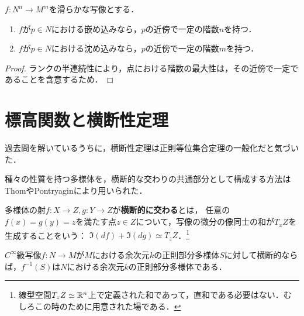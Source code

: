 \documentclass[uplatex,dvipdfmx]{jsreport}
\begin{document}
\begin{theorem}
    $f:N^n\to M^m$を滑らかな写像とする．
    \begin{enumerate}
        \item $f$が$p\in N$における嵌め込みなら，$p$の近傍で一定の階数$n$を持つ．
        \item $f$が$p\in N$における沈め込みなら，$p$の近傍で一定の階数$m$を持つ．
    \end{enumerate}
\end{theorem}
\begin{proof}
    ランクの半連続性により，点における階数の最大性は，その近傍で一定であることを含意するため．
\end{proof}

\section{標高関数と横断性定理}

\begin{tcolorbox}[colframe=ForestGreen, colback=ForestGreen!10!white,breakable,colbacktitle=ForestGreen!40!white,coltitle=black,fonttitle=\bfseries\sffamily,
title=]
    過去問を解いているうちに，横断性定理は正則等位集合定理の一般化だと気づいた．
\end{tcolorbox}

\begin{tcolorbox}[colframe=ForestGreen, colback=ForestGreen!10!white,breakable,colbacktitle=ForestGreen!40!white,coltitle=black,fonttitle=\bfseries\sffamily,
    title=]
    種々の性質を持つ多様体を，横断的な交わりの共通部分として構成する方法はThomやPontryaginにより用いられた．
\end{tcolorbox}

\begin{definition}[transversality]
    多様体の射$f:X\to Z,g:Y\to Z$が\textbf{横断的に交わる}とは，
    任意の$f(x)=g(y)=z$を満たす点$z\in Z$について，写像の微分の像同士の和が$T_xZ$を生成することをいう：
    $\Im(df)+\Im(dg)\simeq T_zZ$．\footnote{線型空間$T_zZ\simeq\mathbb{R}^n$上で定義された和であって，直和である必要はない．むしろこの時のために用意された場である．}
\end{definition}

\begin{theorem}
    $C^\infty$級写像$f:N\to M$が$M$における余次元$k$の正則部分多様体$S$に対して横断的ならば，$f^{-1}(S)$は$N$における余次元$k$の正則部分多様体である．
\end{theorem}
\end{document}
